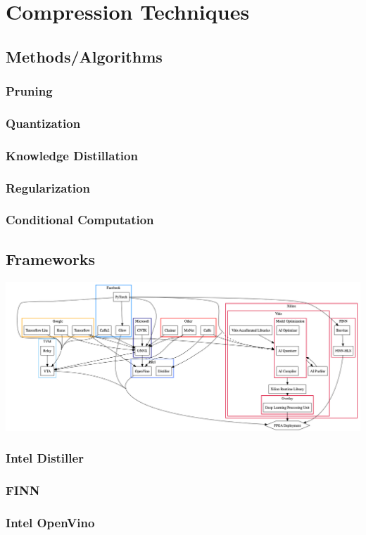 \documentclass[12pt]{article}
\begin{document}
\section{Compression Techniques}
\subsection{Methods/Algorithms}
\subsubsection{Pruning}
\subsubsection{Quantization}
\subsubsection{Knowledge Distillation}
\subsubsection{Regularization}
\subsubsection{Conditional Computation}

\subsection{Frameworks}
\includegraphics[width=\textwidth]{diagram.png}
\subsubsection{Intel Distiller}
\subsubsection{FINN}
\subsubsection{Intel OpenVino}
\end{document}
